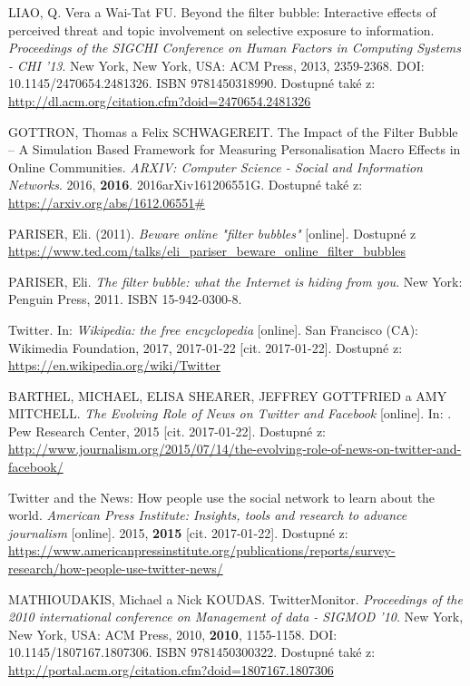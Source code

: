 \documentclass[12pt, a4paper]{article}
\numberwithin{equation}{section} 	%
\begin{document}
\newpage
\begin{thebibliography}{99}

    LIAO, Q. Vera a Wai-Tat FU. Beyond the filter bubble: Interactive effects of perceived threat and topic involvement on selective exposure to information. \textit{Proceedings of the SIGCHI Conference on Human Factors in Computing Systems - CHI '13}. New York, New York, USA: ACM Press, 2013, 2359-2368. DOI: 10.1145/2470654.2481326. ISBN 9781450318990. Dostupné také z: \url{http://dl.acm.org/citation.cfm?doid=2470654.2481326}

    GOTTRON, Thomas a Felix SCHWAGEREIT. The Impact of the Filter Bubble -- A Simulation Based Framework for Measuring Personalisation Macro Effects in Online Communities. \textit{ARXIV: Computer Science - Social and Information Networks}. 2016, \textbf{2016}. 2016arXiv161206551G. Dostupné také z: \url{https://arxiv.org/abs/1612.06551\#}

    PARISER, Eli. (2011). \textit{Beware online "filter bubbles"} [online]. Dostupné z \url{https://www.ted.com/talks/eli_pariser_beware_online_filter_bubbles}

    PARISER, Eli. \textit{The filter bubble: what the Internet is hiding from you}. New York: Penguin Press, 2011. ISBN 15-942-0300-8.

    Twitter. In: \textit{Wikipedia: the free encyclopedia} [online]. San Francisco (CA): Wikimedia Foundation, 2017, 2017-01-22 [cit. 2017-01-22]. Dostupné z: \url{https://en.wikipedia.org/wiki/Twitter}

    BARTHEL, MICHAEL, ELISA SHEARER, JEFFREY GOTTFRIED a AMY MITCHELL. \textit{The Evolving Role of News on Twitter and Facebook} [online]. In: . Pew Research Center, 2015 [cit. 2017-01-22]. Dostupné z: \url{http://www.journalism.org/2015/07/14/the-evolving-role-of-news-on-twitter-and-facebook/}

    Twitter and the News: How people use the social network to learn about the world. \textit{American Press Institute: Insights, tools and research to advance journalism} [online]. 2015, \textbf{2015} [cit. 2017-01-22]. Dostupné z: \url{https://www.americanpressinstitute.org/publications/reports/survey-research/how-people-use-twitter-news/}

    MATHIOUDAKIS, Michael a Nick KOUDAS. TwitterMonitor. \textit{Proceedings of the 2010 international conference on Management of data - SIGMOD '10}. New York, New York, USA: ACM Press, 2010, \textbf{2010}, 1155-1158. DOI: 10.1145/1807167.1807306. ISBN 9781450300322. Dostupné také z: \url{http://portal.acm.org/citation.cfm?doid=1807167.1807306}


\end{thebibliography}
\end{document}
